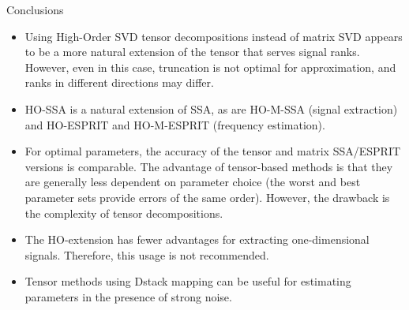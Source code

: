 \documentclass[pdf, unicode, ucs, notheorems]{beamer}
\newcommand{\bluetext}[1]{{\usebeamercolor[fg]{bluetext_color}#1}}
\theoremstyle{definition}
\begin{document}
\begin{frame}{Conclusions}
  \begin{itemize}
    \item Using High-Order SVD tensor decompositions instead of
      matrix SVD appears to be a more natural extension of the tensor
      that serves signal ranks. However, even in this case,
      truncation is not optimal for approximation, and ranks in
      different directions may differ.
      \smallskip
    \item HO-SSA is a natural extension of SSA, as are HO-M-SSA
      (signal extraction) and HO-ESPRIT and HO-M-ESPRIT (frequency estimation).
      \smallskip
    \item For optimal parameters, the accuracy of the tensor and
      matrix SSA/ESPRIT versions is comparable. The advantage of
      tensor-based methods is that they are generally less dependent
      on parameter choice (the worst and best parameter sets provide
      errors of the same order). However, the drawback is the
      complexity of tensor decompositions.
      \smallskip
    \item The HO-extension has fewer advantages for extracting
      one-dimensional signals. Therefore, this usage is not recommended.
      \smallskip
    \item Tensor methods using Dstack mapping can be useful for
      estimating parameters in the presence of strong noise.
  \end{itemize}

\end{frame}
\end{document}
